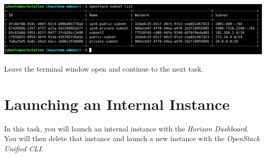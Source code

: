 \documentclass[letterpaper, 12pt]{article}
\begin{document}
\begin{enumerate}
\begin{labstep}
        \begin{center}
            \includegraphics[width=\linewidth]{images/part3/step22.png}
        \end{center}
    \end{labstep}

    \begin{labstep}
        Leave the terminal window open and continue to the next task.
    \end{labstep}

\end{enumerate}

\section{Launching an Internal Instance}\label{sec:launching-an-internal-instance}
In this task, you will launch an internal instance with the \textit{Horizon Dashboard}.
You will then delete that instance and launch a new instance with the \textit{OpenStack Unified CLI}.
\end{document}
